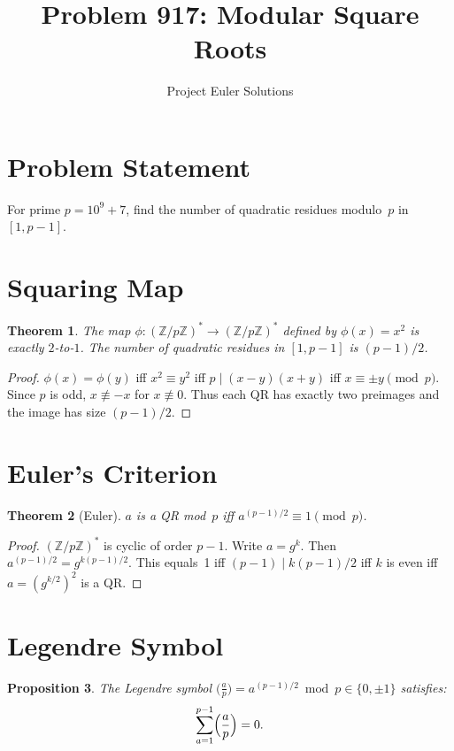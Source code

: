 \documentclass[11pt]{article}
\title{Problem 917: Modular Square Roots}
\author{Project Euler Solutions}
\date{}
\newtheorem{theorem}{Theorem}
\newtheorem{proposition}[theorem]{Proposition}
\begin{document}
\maketitle

\section{Problem Statement}

For prime $p = 10^9 + 7$, find the number of quadratic residues modulo~$p$ in $[1, p-1]$.

\section{Squaring Map}

\begin{theorem}
The map $\phi\colon (\mathbb{Z}/p\mathbb{Z})^* \to (\mathbb{Z}/p\mathbb{Z})^*$ defined by $\phi(x) = x^2$ is exactly $2$-to-$1$. The number of quadratic residues in $[1, p-1]$ is $(p-1)/2$.
\end{theorem}

\begin{proof}
$\phi(x) = \phi(y)$ iff $x^2 \equiv y^2$ iff $p \mid (x-y)(x+y)$ iff $x \equiv \pm y \pmod{p}$. Since $p$ is odd, $x \not\equiv -x$ for $x \not\equiv 0$. Thus each QR has exactly two preimages and the image has size $(p-1)/2$.
\end{proof}

\section{Euler's Criterion}

\begin{theorem}[Euler]
$a$ is a QR mod~$p$ iff $a^{(p-1)/2} \equiv 1 \pmod{p}$.
\end{theorem}

\begin{proof}
$(\mathbb{Z}/p\mathbb{Z})^*$ is cyclic of order $p-1$. Write $a = g^k$. Then $a^{(p-1)/2} = g^{k(p-1)/2}$. This equals~1 iff $(p-1) \mid k(p-1)/2$ iff $k$ is even iff $a = (g^{k/2})^2$ is a QR.
\end{proof}

\section{Legendre Symbol}

\begin{proposition}
The Legendre symbol $\bigl(\frac{a}{p}\bigr) = a^{(p-1)/2} \bmod p \in \{0, \pm 1\}$ satisfies:
\[
\sum_{a=1}^{p-1} \Bigl(\frac{a}{p}\Bigr) = 0.
\]
\end{proposition}
\end{document}

